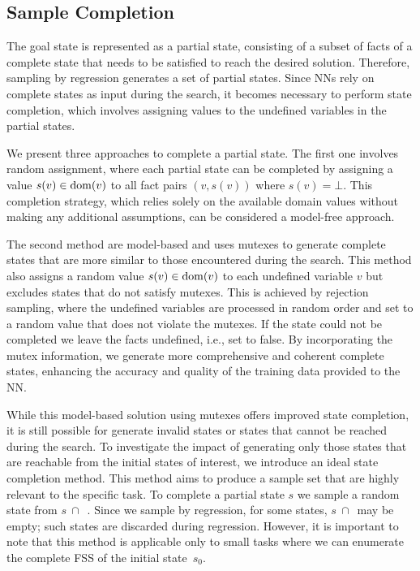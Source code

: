 \subsection{Sample Completion}
\label{sec:sample-completion}

The goal state is represented as a partial state, consisting of a subset of facts of a complete state that needs to be satisfied to reach the desired solution. Therefore, sampling by regression generates a set of partial states. Since NNs rely on complete states as input during the search, it becomes necessary to perform state completion, which involves assigning values to the undefined variables in the partial states.

We present three approaches to complete a partial state. The first one involves random assignment, where each partial state can be completed by assigning a value $s(v)\in\operatorname{dom}(v)$ to all fact pairs $(v,s(v))$ where $s(v)=\bot$. This completion strategy, which relies solely on the available domain values without making any additional assumptions, can be considered a model-free approach.

The second method are model-based and uses mutexes to generate complete states that are more similar to those encountered during the search. This method also assigns a random value $s(v)\in\operatorname{dom}(v)$ to each undefined variable $v$ but excludes states that do not satisfy mutexes. This is achieved by rejection sampling, where the undefined variables are processed in random order and set to a random value that does not violate the mutexes. If the state could not be completed we leave the facts undefined, i.e., set to false. By incorporating the mutex information, we generate more comprehensive and coherent complete states, enhancing the accuracy and quality of the training data provided to the NN.

While this model-based solution using mutexes offers improved state completion, it is still possible for generate invalid states or states that cannot be reached during the search. To investigate the impact of generating only those states that are reachable from the initial states of interest, we introduce an ideal state completion method. This method aims to produce a sample set that are highly relevant to the specific task. To complete a partial state $s$ we sample a random state from $s~\cap$~\fssp. Since we sample by regression, for some states, $s~\cap$~\fssp may be empty; such states are discarded during regression. However, it is important to note that this method is applicable only to small tasks where we can enumerate the complete FSS of the initial state~$s_0$.

